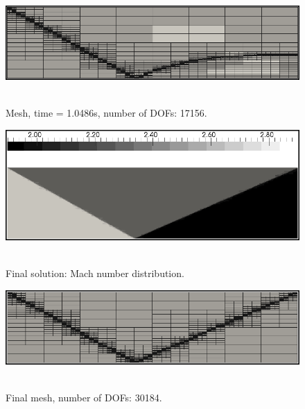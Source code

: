 \begin{figure}[H]
\begin{center}
\includegraphics[width=\textwidth]{examples_img/reflected-shock/rs_mesh.png}\ \ \ 
\end{center}

\caption{Mesh, time = 1.0486s, number of DOFs: 17156.}

\label{fig:rs-2}
\end{figure}

\begin{figure}[H]
\begin{center}
\includegraphics[width=\textwidth]{examples_img/reflected-shock/rs_finalSln.png}\ \ \ 
\end{center}

\caption{Final solution: Mach number distribution.}

\label{fig:rs-3}
\end{figure}

\begin{figure}[H]
\begin{center}
\includegraphics[width=\textwidth]{examples_img/reflected-shock/rs_finalMesh.png}\ \ \ 
\end{center}

\caption{Final mesh, number of DOFs: 30184.}

\label{fig:rs-4}
\end{figure}

